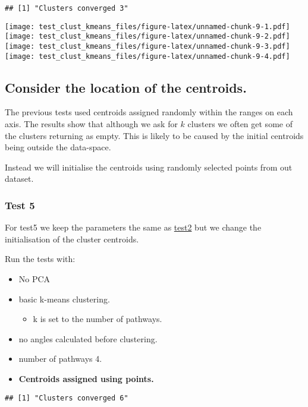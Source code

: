 \documentclass[
]{article}
\providecommand{\tightlist}{%
  \setlength{\itemsep}{0pt}\setlength{\parskip}{0pt}}
\begin{document}
\begin{verbatim}
## [1] "Clusters converged 3"
\end{verbatim}

\texttt{[image: test\_clust\_kmeans\_files/figure-latex/unnamed-chunk-9-1.pdf]}
\texttt{[image: test\_clust\_kmeans\_files/figure-latex/unnamed-chunk-9-2.pdf]}
\texttt{[image: test\_clust\_kmeans\_files/figure-latex/unnamed-chunk-9-3.pdf]}
\texttt{[image: test\_clust\_kmeans\_files/figure-latex/unnamed-chunk-9-4.pdf]}

\hypertarget{how_cents}{%
\subsection{Consider the location of the centroids.}\label{how_cents}}

The previous tests used centroids assigned randomly within the ranges on
each axis. The results show that although we ask for \(k\) clusters we
often get some of the clusters returning as empty. This is likely to be
caused by the initial centroids being outside the data-space.

Instead we will initialise the centroids using randomly selected points
from out dataset.

\hypertarget{test5}{%
\subsubsection{Test 5}\label{test5}}

For test5 we keep the parameters the same as
\protect\hyperlink{test2}{test2} but we change the initialisation of the
cluster centroids.

Run the tests with:

\begin{itemize}
\tightlist
\item
  No PCA
\item
  basic k-means clustering.

  \begin{itemize}
  \tightlist
  \item
    k is set to the number of pathways.
  \end{itemize}
\item
  no angles calculated before clustering.
\item
  number of pathways 4.
\item
  \textbf{Centroids assigned using points.}
\end{itemize}

\begin{verbatim}
## [1] "Clusters converged 6"
\end{verbatim}
\end{document}
